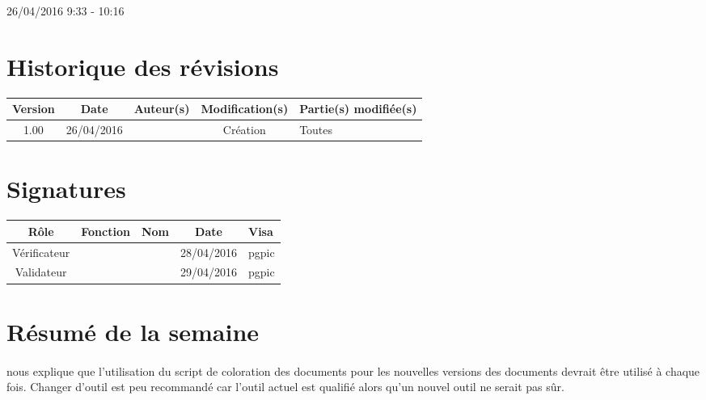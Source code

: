 \documentclass [a4paper] {article}
\begin{document}
\rhead{}

26/04/2016
\hfill   
\hfill 	9:33 - 10:16 				%



\section*{Historique des révisions}
\begin{center}
			\begin{tabular}{| c | c | c | c | p{4cm} |}
				\hline
				\rowcolor{Gray}
				Version & Date & Auteur(s) & Modification(s) & Partie(s) modifiée(s)		 \\
				\hline
				1.00 & 26/04/2016 & \Pierre & Création & Toutes \\
		\hline		
			\end{tabular}
		\end{center}

\section*{Signatures}

		\begin{center}
			\begin{tabular}{| c | c | c | c | p{4cm} |}
				\hline
				\rowcolor{Gray}
				Rôle & Fonction & Nom & Date & Visa		 \\
				\hline
				Vérificateur & \RQA & \Kafui & 28/04/2016 & pgpic \\[30pt]
				\hline
				Validateur & \CP & \Sergi & 29/04/2016 & pgpic \\[30pt]	
				\hline
			\end{tabular}
		\end{center}


\section{Résumé de la semaine}
\paragraph*{}
\nomTuteurQualite{} nous explique que l'utilisation du script de coloration des documents pour les nouvelles versions des documents devrait être utilisé à chaque fois. Changer d'outil est peu recommandé car l'outil actuel est qualifié alors qu'un nouvel outil ne serait pas sûr.
\end{document}
